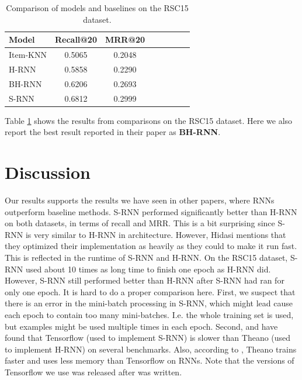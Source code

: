 




\begin{table}
	\centering
	\begin{tabular}{l*{6}{c}r}
		Model			& Recall@20	& MRR@20 \\
		\hline
		Item-KNN		& 0.5065	& 0.2048 \\
		H-RNN			& 0.5858	& 0.2290 \\
		BH-RNN			& 0.6206	& 0.2693 \\
		S-RNN			& 0.6812	& 0.2999 \\
	\end{tabular}
	\caption{Comparison of models and baselines on the RSC15 dataset.}
	\label{table:rsc15-comp}
\end{table}

Table \ref{table:rsc15-comp} shows the results from comparisons on the RSC15 dataset. Here we also report the best result reported in their paper as \textbf{BH-RNN}.






\section{Discussion}
Our results supports the results we have seen in other papers, where RNNs outperform baseline methods. S-RNN performed significantly better than H-RNN on both datasets, in terms of recall and MRR. This is a bit surprising since S-RNN is very similar to H-RNN in architecture. However, Hidasi \cite{email:Hidasi} mentions that they optimized their implementation as heavily as they could to make it run fast. This is reflected in the runtime of S-RNN and H-RNN. On the RSC15 dataset, S-RNN used about 10 times as long time to finish one epoch as H-RNN did. However, S-RNN still performed better than H-RNN after S-RNN had ran for only one epoch. It is hard to do a proper comparison here. First, we suspect that there is an error in the mini-batch processing in S-RNN, which might lead cause each epoch to contain too many mini-batches. I.e. the whole training set is used, but examples might be used multiple times in each epoch. Second, \cite{DBLP:journals/corr/BahrampourRSS15} and \cite{glample-rnn-benchmarks} have found that Tensorflow (used to implement S-RNN) is slower than Theano (used to implement H-RNN) on several benchmarks. Also, according to \cite{kuster-good-bad-ugly}, Theano trains faster and uses less memory than Tensorflow on RNNs. Note that the versions of Tensorflow we use was released after \cite{kuster-good-bad-ugly} was written.

